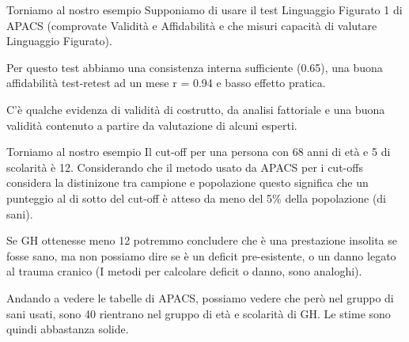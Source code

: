 \documentclass[
  ignorenonframetext,
  aspectratio=169,
]{beamer}
\begin{document}
\begin{frame}{Torniamo al nostro esempio}
\label{torniamo-al-nostro-esempio-1}
Supponiamo di usare il test Linguaggio Figurato 1 di APACS (comprovate
Validità e Affidabilità e che misuri capacità di valutare Linguaggio
Figurato).

Per questo test abbiamo una consistenza interna sufficiente (0.65), una
buona affidabilità test-retest ad un mese r = 0.94 e basso effetto
pratica.

C'è qualche evidenza di validità di costrutto, da analisi fattoriale e
una buona validità contenuto a partire da valutazione di alcuni esperti.
\end{frame}

\begin{frame}{Torniamo al nostro esempio}
\label{torniamo-al-nostro-esempio-2}
Il cut-off per una persona con 68 anni di età e 5 di scolarità è 12.
Considerando che il metodo usato da APACS per i cut-offs considera la
distinizone tra campione e popolazione questo significa che un punteggio
al di sotto del cut-off è atteso da meno del 5\% della popolazione (di
sani).

Se GH ottenesse meno 12 potremmo concludere che è una prestazione
insolita se fosse sano, ma non possiamo dire se è un deficit
pre-esistente, o un danno legato al trauma cranico (I metodi per
calcolare deficit o danno, sono analoghi).

Andando a vedere le tabelle di APACS, possiamo vedere che però nel
gruppo di sani usati, sono 40 rientrano nel gruppo di età e scolarità di
GH. Le stime sono quindi abbastanza solide.
\end{frame}
\end{document}
